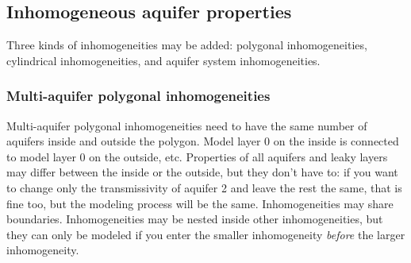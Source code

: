 \documentclass [10pt,letterpaper] {article}
\begin{document}
\subsection{Inhomogeneous aquifer properties}
Three kinds of inhomogeneities may be added: polygonal inhomogeneities, cylindrical inhomogeneities,
and aquifer system inhomogeneities.

\subsubsection{Multi-aquifer polygonal inhomogeneities}
Multi-aquifer polygonal inhomogeneities need to have the same number of
aquifers inside and outside the polygon. Model layer 0 on the inside is connected
to model layer 0 on the outside, etc. Properties of all aquifers and leaky layers may
differ between the inside or the outside, but they don't have to: if you want to change
only the transmissivity of aquifer 2 and leave the rest the same, that is fine too, but
the modeling process will be the same. Inhomogeneities may share boundaries. Inhomogeneities may be nested
inside other inhomogeneities, but they can only be modeled if you enter the smaller inhomogeneity \emph{before} the larger inhomogeneity. 
\end{document}
